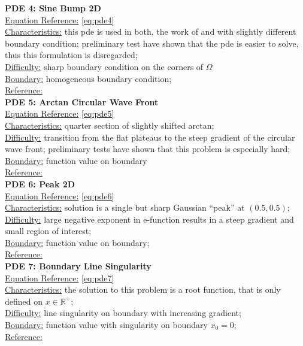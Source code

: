 \documentclass[./\jobname.tex]{subfiles}
\begin{document}
\textbf{PDE 4: Sine Bump 2D} \\
\underline{Equation Reference:} \eqref{eq:pde4} \\
\underline{Characteristics:} this \gls{pde} is used in both, the work of \cite{chaquet_using_2019} and  \cite{mitchell_nist_2018} with slightly different boundary condition; preliminary test have shown that the \cite{chaquet_using_2019} \gls{pde} is easier to solve, thus this formulation is disregarded;\\
\underline{Difficulty:} sharp boundary condition on the corners of $\Omega$ \\
\underline{Boundary:} homogeneous boundary condition; \\
\underline{Reference:} \cite{mitchell_nist_2018}\\

\textbf{PDE 5: Arctan Circular Wave Front} \\
\underline{Equation Reference:} \eqref{eq:pde5} \\
\underline{Characteristics:} quarter section of slightly shifted arctan; \\
\underline{Difficulty:} transition from the flat plateaus to the steep gradient of the circular wave front; preliminary tests have shown that this problem is especially hard; \\
\underline{Boundary:} function value on boundary \\
\underline{Reference:} \cite{mitchell_nist_2018} \\

\textbf{PDE 6: Peak 2D} \\
\underline{Equation Reference:} \eqref{eq:pde6} \\
\underline{Characteristics:} solution is a single but sharp Gaussian ``peak'' at $(0.5, 0.5)$; \\
\underline{Difficulty:} large negative exponent in e-function results in a steep gradient and small region of interest; \\
\underline{Boundary:} function value on boundary; \\
\underline{Reference:} \cite{mitchell_nist_2018} \\

\textbf{PDE 7: Boundary Line Singularity} \\
\underline{Equation Reference:} \eqref{eq:pde7} \\
\underline{Characteristics:} the solution to this problem is a root function, that is only defined on $x \in \mathbb{R}^{+}$; \\
\underline{Difficulty:} line singularity on boundary with increasing gradient; \\
\underline{Boundary:} function value with singularity on boundary $x_0 = 0$; \\
\underline{Reference:} \cite{mitchell_nist_2018} \\
\end{document}

